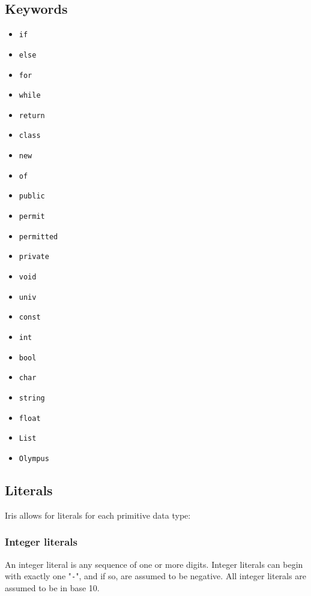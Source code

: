 \documentclass{article}
\begin{document}
\subsection{Keywords}
\begin{multicols}{3}
\begin{itemize}
    \item[] \texttt{if}
    \item[] \texttt{else}
    \item[] \texttt{for}
    \item[] \texttt{while}
    \item[] \texttt{return}
    \item[] \texttt{class}
    \item[] \texttt{new}
    \item[] \texttt{of}
    \item[] \texttt{public}
    \item[] \texttt{permit}     %
    \item[] \texttt{permitted}
    \item[] \texttt{private}
    \item[] \texttt{void}
    \item[] \texttt{univ}
    \item[] \texttt{const}
    \item[] \texttt{int}
    \item[] \texttt{bool}
    \item[] \texttt{char}
    \item[] \texttt{string}
    \item[] \texttt{float}
    \item[] \texttt{List}       %
    \item[] \texttt{Olympus}    %
\end{itemize}
\end{multicols}
\subsection{Literals}
Iris allows for literals for each primitive data type:

\subsubsection{Integer literals}
An integer literal is any sequence of one or more digits. Integer literals can begin with exactly one "\texttt{-}", and if so, are assumed to be negative. All integer literals are assumed to be in base 10.
\end{document}

